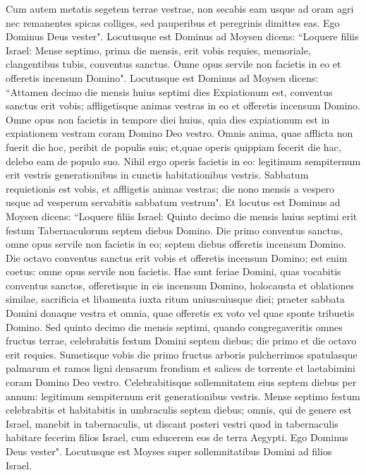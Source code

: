 \begin{biblechapter}
\verse Cum autem metatis segetem terrae vestrae, non secabis eam usque ad oram agri nec remanentes spicas colliges, sed pauperibus et peregrinis dimittes eas. Ego Dominus Deus vester". 
\verse Locutusque est Dominus ad Moysen dicens: 
\verse “Loquere filiis Israel: Mense septimo, prima die mensis, erit vobis requies, memoriale, clangentibus tubis, conventus sanctus. 
\verse Omne opus servile non facietis in eo et offeretis incensum Domino". 
\verse Locutusque est Dominus ad Moysen dicens: 
\verse “Attamen decimo die mensis huius septimi dies Expiationum est, conventus sanctus erit vobis; affligetisque animas vestras in eo et offeretis incensum Domino. 
\verse Omne opus non facietis in tempore diei huius, quia dies expiationum est in expiationem vestram coram Domino Deo vestro. 
\verse Omnis anima, quae afflicta non fuerit die hoc, peribit de populis suis; 
\verse et,quae operis quippiam fecerit die hac, delebo eam de populo suo. 
\verse Nihil ergo operis facietis in eo: legitimum sempiternum erit vestris generationibus in cunctis habitationibus vestris. 
\verse Sabbatum requietionis est vobis, et affligetis animas vestras; die nono mensis a vespero usque ad vesperum servabitis sabbatum vestrum". 
\verse Et locutus est Dominus ad Moysen dicens: 
\verse “Loquere filiis Israel: Quinto decimo die mensis huius septimi erit festum Tabernaculorum septem diebus Domino. 
\verse Die primo conventus sanctus, omne opus servile non facietis in eo; 
\verse septem diebus offeretis incensum Domino. Die octavo conventus sanctus erit vobis et offeretis incensum Domino; est enim coetus: omne opus servile non facietis. 
\verse Hae sunt feriae Domini, quas vocabitis conventus sanctos, offeretisque in eis incensum Domino, holocausta et oblationes similae, sacrificia et libamenta iuxta ritum uniuscuiusque diei; 
\verse praeter sabbata Domini donaque vestra et omnia, quae offeretis ex voto vel quae sponte tribuetis Domino. 
\verse Sed quinto decimo die mensis septimi, quando congregaveritis omnes fructus terrae, celebrabitis festum Domini septem diebus; die primo et die octavo erit requies. 
\verse Sumetisque vobis die primo fructus arboris pulcherrimos spatulasque palmarum et ramos ligni densarum frondium et salices de torrente et laetabimini coram Domino Deo vestro. 
\verse Celebrabitisque sollemnitatem eius septem diebus per annum: legitimum sempiternum erit generationibus vestris. Mense septimo festum celebrabitis 
\verse et habitabitis in umbraculis septem diebus; omnis, qui de genere est Israel, manebit in tabernaculis, 
\verse ut discant posteri vestri quod in tabernaculis habitare fecerim filios Israel, cum educerem eos de terra Aegypti. Ego Dominus Deus vester". 
\verse Locutusque est Moyses super sollemnitatibus Domini ad filios Israel. 
\end{biblechapter}

